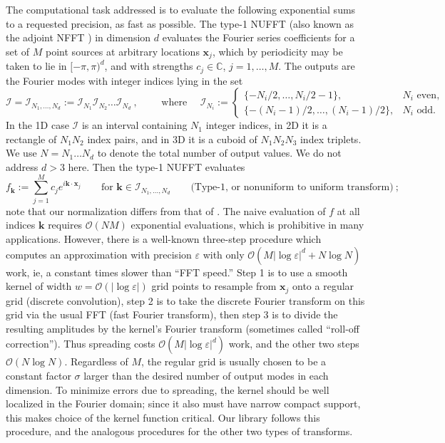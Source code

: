 \documentclass[10pt]{article}
\newcommand{\be}{\begin{equation}}
\newcommand{\ee}{\end{equation}}
\newcommand{\mbf}[1]{{\mathbf #1}}
\newcommand{\eps}{\varepsilon}
\newcommand{\bigO}{{\mathcal O}}
\newcommand{\xx}{\mbf{x}}
\newcommand{\kk}{\mbf{k}}
\newcommand{\KK}{{\mathcal I}}     %
\newcommand{\rat}{\sigma}          %
\newcommand{\NU}{{nonuniform}}       %
\newcommand{\U}{{uniform}}
\begin{document}
The computational task addressed
is to evaluate the following exponential sums to a requested precision,
as fast as possible.
The type-1 NUFFT (also known as the adjoint NFFT \cite{nfftchap,usingnfft})
in dimension $d$ %
evaluates the Fourier series coefficients for a set of
$M$ point sources at arbitrary locations $\xx_j$, which by periodicity
may be taken to lie in $[-\pi,\pi)^d$, and with
strengths $c_j\in\mathbb{C}$,  $j=1,\dots,M$.
The outputs are the Fourier modes with integer indices lying in
the set
$$
\KK = \KK_{N_1,\dots,N_d} := \KK_{N_1} \KK_{N_2} \dots \KK_{N_d}~,
\qquad\mbox{ where } \quad
\KK_{N_i} := \left\{\begin{array}{ll} \{-N_i/2,\ldots,N_i/2-1\}, & N_i \mbox{ even},\\
\{-(N_i-1)/2,\ldots,(N_i-1)/2\}, & N_i \mbox{ odd}.
\end{array}\right.
$$
In the 1D case $\KK$ is an interval containing $N_1$ integer indices, in 2D it is a rectangle of $N_1N_2$ index pairs, and in 3D it is a cuboid of $N_1N_2N_3$ index triplets.
We use $N=N_1\dots N_d$ to denote the total number of output values.
We do not address $d>3$ here.
Then the type-1 NUFFT evaluates
\be
f_\kk := %
\sum_{j=1}^M c_j e^{i \kk\cdot \xx_j}
\qquad \mbox{for } \kk \in \KK_{N_1,\dots,N_d}
\qquad \mbox{(Type-1, or \NU\ to \U\ transform)}
~;
\label{1}
\ee
note that our normalization differs from that of \cite{dutt,nufft}.
The naive evaluation of $f$ at all indices $\kk$ requires $\bigO(NM)$
exponential evaluations, which is prohibitive
in many applications.
However, there is a well-known three-step procedure
which computes an approximation with precision $\eps$ with only
$\bigO(M |\log\eps|^d + N \log N)$ work, ie, a constant
times slower than ``FFT speed.''
Step 1 is to use a smooth kernel of width $w=\bigO(|\log\eps|)$
grid points to resample from $\xx_j$ onto a regular
grid (discrete convolution), step 2 is to
take the discrete Fourier transform on this grid via the usual FFT
(fast Fourier transform), then step 3 is
to divide the resulting amplitudes by the kernel's Fourier transform
(sometimes called ``roll-off correction'').
Thus spreading costs $\bigO(M|\log\eps|^d)$ work, and the other two
steps $\bigO(N \log N)$.
Regardless of $M$, the regular grid is usually chosen to be a constant factor
$\rat$ larger than the desired number of output modes in each dimension.
To minimize errors due to spreading, the kernel should be
well localized in the Fourier domain; since it also must have narrow compact
support, this makes choice of the kernel function critical.
Our library follows this procedure, and the analogous procedures
for the other two types of transforms.
\end{document}

